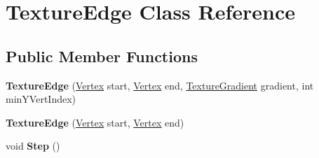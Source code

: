 \hypertarget{class_texture_edge}{}\section{Texture\+Edge Class Reference}
\label{class_texture_edge}
\subsection*{Public Member Functions}
\begin{DoxyCompactItemize}
\item 
\hypertarget{class_texture_edge_adbdc3b619799de6ef2ca4a60b072a7f7}{}{\bfseries Texture\+Edge} (\hyperlink{struct_vertex}{Vertex} start, \hyperlink{struct_vertex}{Vertex} end, \hyperlink{class_texture_gradient}{Texture\+Gradient} gradient, int min\+Y\+Vert\+Index)\label{class_texture_edge_adbdc3b619799de6ef2ca4a60b072a7f7}

\item 
\hypertarget{class_texture_edge_a15f585808723671c895a71792fe19c60}{}{\bfseries Texture\+Edge} (\hyperlink{struct_vertex}{Vertex} start, \hyperlink{struct_vertex}{Vertex} end)\label{class_texture_edge_a15f585808723671c895a71792fe19c60}

\item 
\hypertarget{class_texture_edge_a65e70bfe49405d2bd92b32066fdc0752}{}void {\bfseries Step} ()\label{class_texture_edge_a65e70bfe49405d2bd92b32066fdc0752}

\end{DoxyCompactItemize}
